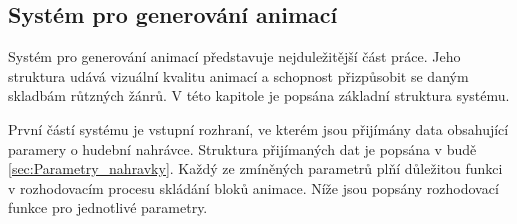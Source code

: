 \subsection{Systém pro generování animací} \label{sec:System_generovani_animaci}

Systém pro generování animací představuje nejduležitější část práce. Jeho struktura udává vizuální kvalitu animací a schopnost přizpůsobit se daným skladbám růtzných žánrů. V této kapitole je popsána základní struktura systému. 

První částí systému je vstupní rozhraní, ve kterém jsou přijímány data obsahující paramery o hudební nahrávce. Struktura přijímaných dat je popsána v budě \ref{sec:Parametry_nahravky}. Každý ze zmíněných parametrů plňí důležitou funkci v rozhodovacím procesu skládání bloků animace. Níže jsou popsány rozhodovací funkce pro jednotlivé parametry.

